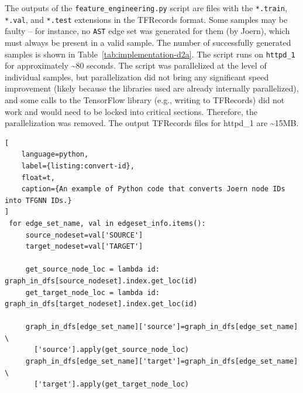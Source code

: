 The outputs of the \texttt{feature\_engineering.py} script are files with the \texttt{*.train}, \texttt{*.val}, and \texttt{*.test} extensions in the TFRecords format. Some samples may be faulty -- for instance, no \texttt{AST} edge set was generated for them (by Joern), which must always be present in a valid sample. The number of successfully generated samples is shown in Table~\ref{tab:implementation-d2a}. The script runs on \texttt{httpd\_1} for approximately \textasciitilde80 seconds. The script was parallelized at the level of individual samples, but parallelization did not bring any significant speed improvement (likely because the libraries used are already internally parallelized), and some calls to the TensorFlow library (e.g., writing to TFRecords) did not work and would need to be locked into critical sections. Therefore, the parallelization was removed. The output TFRecords files for httpd\_1 are \textasciitilde15MB.

\begin{lstlisting}[
    language=python, 
    label={listing:convert-id}, 
    float=t,
    caption={An example of Python code that converts Joern node IDs into TFGNN IDs.}
]
 for edge_set_name, val in edgeset_info.items():
     source_nodeset=val['SOURCE']
     target_nodeset=val['TARGET']

     get_source_node_loc = lambda id: graph_in_dfs[source_nodeset].index.get_loc(id)
     get_target_node_loc = lambda id: graph_in_dfs[target_nodeset].index.get_loc(id)

     graph_in_dfs[edge_set_name]['source']=graph_in_dfs[edge_set_name] \      
       ['source'].apply(get_source_node_loc)
     graph_in_dfs[edge_set_name]['target']=graph_in_dfs[edge_set_name] \
       ['target'].apply(get_target_node_loc)
\end{lstlisting}

